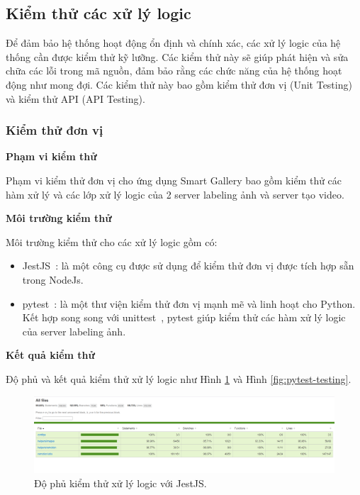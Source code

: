 \subsection{Kiểm thử các xử lý logic}

Để đảm bảo hệ thống hoạt động ổn định và chính xác, các xử lý logic của hệ thống cần được kiểm thử kỹ lưỡng. Các kiểm thử này sẽ giúp phát hiện và sửa chữa các lỗi trong mã nguồn, đảm bảo rằng các chức năng của hệ thống hoạt động như mong đợi. Các kiểm thử này bao gồm kiểm thử đơn vị (Unit Testing) và kiểm thử API (API Testing).
\subsubsection{Kiểm thử đơn vị}


\textbf{Phạm vi kiểm thử}

Phạm vi kiểm thử đơn vị cho ứng dụng Smart Gallery bao gồm kiểm thử các hàm xử lý và các lớp xử lý logic của 2 server labeling ảnh và server tạo video. 

\textbf{Môi trường kiểm thử}

Môi trường kiểm thử cho các xử lý logic gồm có: 
\begin{itemize}
    \item JestJS~\cite{jestJS}: là một công cụ được sử
    dụng để kiểm thử đơn vị được tích hợp sẵn trong NodeJs.
    \item pytest~\cite{pytest}: là một thư viện kiểm thử đơn vị mạnh mẽ và linh hoạt cho Python. Kết hợp song song với unittest~\cite{unittest}, pytest giúp kiểm thử các hàm xử lý logic của server labeling ảnh.
\end{itemize}

\textbf{Kết quả kiểm thử}

Độ phủ và kết quả kiểm thử xử lý logic như Hình \ref{fig:jest-testing} và Hình \ref{fig:pytest-testing}.

\begin{figure}[H]
    \centering  
    \includegraphics[width=1\textwidth]{figures/c4/4-3/jest.png}
    \caption{Độ phủ kiểm thử xử lý logic với JestJS.}
    \label{fig:jest-testing}
\end{figure}

